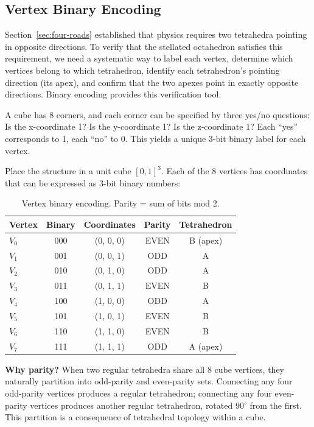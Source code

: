 \documentclass[aps,prd,preprint,superscriptaddress,showpacs,preprintnumbers,amsmath,amssymb,nofootinbib]{revtex4-2}
\begin{document}
\subsection{Vertex Binary Encoding}
\label{subsec:vertices}

Section~\ref{sec:four-roads} established that physics requires two tetrahedra pointing in opposite directions. To verify that the stellated octahedron satisfies this requirement, we need a systematic way to label each vertex, determine which vertices belong to which tetrahedron, identify each tetrahedron's pointing direction (its apex), and confirm that the two apexes point in exactly opposite directions. Binary encoding provides this verification tool.

A cube has 8 corners, and each corner can be specified by three yes/no questions: Is the x-coordinate 1? Is the y-coordinate 1? Is the z-coordinate 1? Each ``yes'' corresponds to 1, each ``no'' to 0. This yields a unique 3-bit binary label for each vertex.

Place the structure in a unit cube $[0,1]^3$. Each of the 8 vertices has coordinates that can be expressed as 3-bit binary numbers:

\begin{table}[H]
\centering
\begin{tabular*}{\textwidth}{@{\extracolsep{\fill}} lcccc @{}}
\toprule
\textbf{Vertex} & \textbf{Binary} & \textbf{Coordinates} & \textbf{Parity} & \textbf{Tetrahedron} \\
\midrule
$V_0$ & 000 & (0, 0, 0) & EVEN & B (apex) \\
$V_1$ & 001 & (0, 0, 1) & ODD & A \\
$V_2$ & 010 & (0, 1, 0) & ODD & A \\
$V_3$ & 011 & (0, 1, 1) & EVEN & B \\
$V_4$ & 100 & (1, 0, 0) & ODD & A \\
$V_5$ & 101 & (1, 0, 1) & EVEN & B \\
$V_6$ & 110 & (1, 1, 0) & EVEN & B \\
$V_7$ & 111 & (1, 1, 1) & ODD & A (apex) \\
\bottomrule
\end{tabular*}
\caption{Vertex binary encoding. Parity = sum of bits mod 2.}
\label{tab:vertices}
\end{table}

\textbf{Why parity?} When two regular tetrahedra share all 8 cube vertices, they naturally partition into odd-parity and even-parity sets. Connecting any four odd-parity vertices produces a regular tetrahedron; connecting any four even-parity vertices produces another regular tetrahedron, rotated 90$^\circ$ from the first. This partition is a consequence of tetrahedral topology within a cube.
\end{document}
